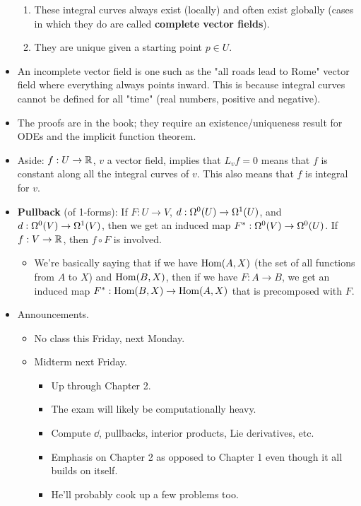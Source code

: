 \documentclass[../notes.tex]{subfiles}
\begin{document}
\begin{itemize}
    \begin{enumerate}
        \item These integral curves always exist (locally) and often exist globally (cases in which they do are called \textbf{complete vector fields}).
        \item They are unique given a starting point $p\in U$.
    \end{enumerate}
    \item An incomplete vector field is one such as the "all roads lead to Rome" vector field where everything always points inward. This is because integral curves cannot be defined for all "time" (real numbers, positive and negative).
    \item The proofs are in the book; they require an existence/uniqueness result for ODEs and the implicit function theorem.
    \item Aside: $f:U\to\R$, $v$ a vector field, implies that $L_vf=0$ means that $f$ is constant along all the integral curves of $v$. This also means that $f$ is integral for $v$.
    \item \textbf{Pullback} (of 1-forms): If $F:U\to V$, $d:\ome[0]{U}\to\ome[1]{U}$, and $d:\ome[0]{V}\to\ome[1]{V}$, then we get an induced map $F^*:\ome[0]{V}\to\ome[0]{U}$. If $f:V\to\R$, then $f\circ F$ is involved.
    \begin{itemize}
        \item We're basically saying that if we have $\Hom(A,X)$ (the set of all functions from $A$ to $X$) and $\Hom(B,X)$, then if we have $F:A\to B$, we get an induced map $F^*:\Hom(B,X)\to\Hom(A,X)$ that is precomposed with $F$.
    \end{itemize}
    \item {}Announcements.
    \begin{itemize}
        \item No class this Friday, next Monday.
        \item Midterm next Friday.
        \begin{itemize}
            \item Up through Chapter 2.
            \item The exam will likely be computationally heavy.
            \item Compute $\dd$, pullbacks, interior products, Lie derivatives, etc.
            \item Emphasis on Chapter 2 as opposed to Chapter 1 even though it all builds on itself.
            \item He'll probably cook up a few problems too.

\end{itemize}
\end{itemize}
\end{itemize}
\end{document}
